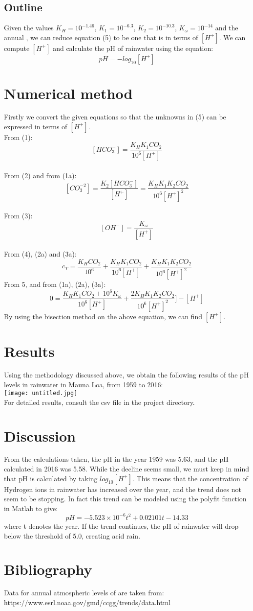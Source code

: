 \documentclass{article}
\begin{document}
	\subsection{Outline}
	Given the values ${K_H  = 10^{-1.46}}$, ${ K_1 =  10^{-6.3}}$, ${ K_2 = 10^{-10.3}}$, ${ K_\omega = 10^{-14}}$ and the annual , we can reduce equation (5) to be one that is in terms of ${[H^+]}$. We can compute ${[H^+]}$ and calculate the pH of rainwater using the equation:
	\[ pH = -log_{10}[H^+] \tag{6} \]
	
	\section{Numerical method}
	Firstly we convert the given equations so that the unknowns in (5) can be expressed in terms of ${[H^+]}$. \\
	From (1):
	\[ [HCO_3^-] = \frac{K_HK_1CO_2}{10^6[H^+]} \tag{1a} \] \\
	From (2) and from (1a):
	\[ [CO_3^{-2}] = \frac{K_2[HCO_3^-]}{[H^+]} \tag{2a} = \frac{K_HK_1K_2CO_2}{10^6[H^+]^2} \] \\
	From (3):
	\[ [OH^-] = \frac{K_\omega}{[H^+]} \tag{3a} \] \\
	From (4), (2a) and (3a):
	\[ c_T = \frac{K_HCO_2}{10^6} + \frac{K_HK_1CO_2}{10^6[H^+]} + \frac{K_HK_1K_2CO_2}{10^6[H^+]^2} \tag{4a} \]
	From 5, and from (1a), (2a), (3a):
	\[ 0 =  \frac{K_HK_1CO_2 + 10^6K_\omega}{10^6[H^+]} + \frac{2K_HK_1K_2CO_2}{10^6[H^+]^2}] - [H^+] \tag{5a} \]
	By using the bisection method on the above equation, we can find ${[H^+]}$.
	
	\section{Results}
	Using the methodology discussed above, we obtain the following results of the pH levels in rainwater in Mauna Loa, from 1959 to 2016:\\
	\texttt{[image: untitled.jpg]} \\
	For detailed results, consult the csv file in the project directory.
	
	\section{Discussion}
	From the calculations taken, the pH in the year 1959 was 5.63, and the pH calculated in 2016 was 5.58. While the decline seems small, we must keep in mind that pH is calculated by taking ${log_{10}}{[H^+]}$. This means that the concentration of Hydrogen ions in rainwater has increased over the year, and the trend does not seem to be stopping. In fact this trend can be modeled using the polyfit function in Matlab to give:
	\[pH = -5.523 \times 10^{-6}t^2 + 0.02101t - 14.33\] 
	where t denotes the year. If the trend continues, the pH of rainwater will drop below the threshold of 5.0, creating acid rain.
	\newpage
	\section{Bibliography}
	Data for annual atmospheric levels of  are taken from: \\
	https://www.esrl.noaa.gov/gmd/ccgg/trends/data.html
\end{document}
